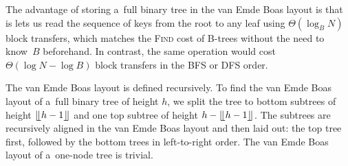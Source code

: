 The advantage of storing a~full binary tree in the van Emde Boas layout
is that is lets us read the sequence of keys from the root to any leaf
using $\Theta(\log_B N)$ block transfers, which matches the \textsc{Find}
cost of \mbox{B-trees} without the need to know~$B$ beforehand.
In contrast, the same operation would cost $\Theta(\log N-\log B)$ block
transfers in the BFS or DFS order.

The van Emde Boas layout is defined recursively. To find the van Emde Boas layout
of a~full binary tree of height $h$, we split the tree to bottom subtrees
of height $\lfloor \kern -0.22em \lfloor h-1 \rfloor \kern -0.22em \rfloor$ and one top subtree of height $h - \lfloor \kern -0.22em \lfloor
h-1 \rfloor \kern -0.22em \rfloor$.
The subtrees are recursively aligned in the van Emde Boas layout and then laid
out: the top tree first, followed by the bottom trees in left-to-right order.
The van Emde Boas layout of a~one-node tree is trivial.

